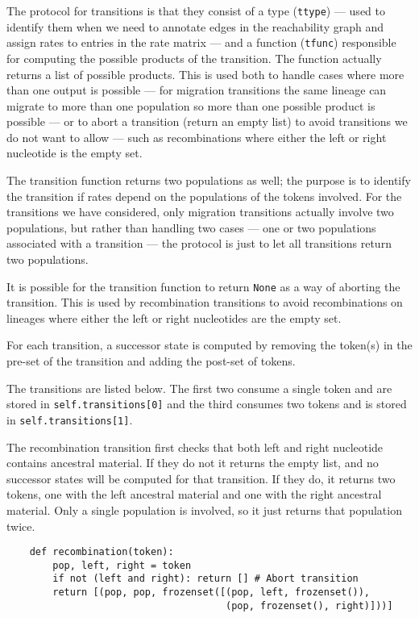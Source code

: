 The protocol for transitions is that they consist of a type (\texttt{ttype}) --- used to identify them when we need to annotate edges in the reachability graph and assign rates to entries in the rate matrix --- and a function (\texttt{tfunc}) responsible for computing the possible products of the transition. The function actually returns a list of possible products. This is used both to handle cases where more than one output is possible --- for migration transitions the same lineage can migrate to more than one population so more than one possible product is possible --- or to abort a transition (return an empty list) to avoid transitions we do not want to allow --- such as recombinations where either the left or right nucleotide is the empty set.

 The transition function returns two populations as well; the purpose is to identify the transition if rates depend on the populations of the tokens involved. For the transitions we have considered, only migration transitions actually involve two populations, but rather than handling two cases --- one or two populations associated with a transition --- the protocol is just to let all transitions return two populations.

It is possible for the transition function to return \texttt{None} as a way of aborting the transition. This is used by recombination transitions to avoid recombinations on lineages where either the left or right nucleotides are the empty set.

For each transition, a successor state is computed by removing the token(s) in the pre-set of the transition and adding the post-set of tokens.

The transitions are listed below. The first two consume a single token and are stored in \texttt{self.transitions[0]} and the third consumes two tokens and is stored in \texttt{self.transitions[1]}.

The recombination transition first checks that both left and right nucleotide contains ancestral material. If they do not it returns the empty list, and no successor states will be computed for that transition. If they do, it returns two tokens, one with the left ancestral material and one with the right ancestral material. Only a single population is involved, so it just returns that population twice.

\begin{lstlisting}
    def recombination(token):
        pop, left, right = token
        if not (left and right): return [] # Abort transition
        return [(pop, pop, frozenset([(pop, left, frozenset()),
                                      (pop, frozenset(), right)]))]
\end{lstlisting}

